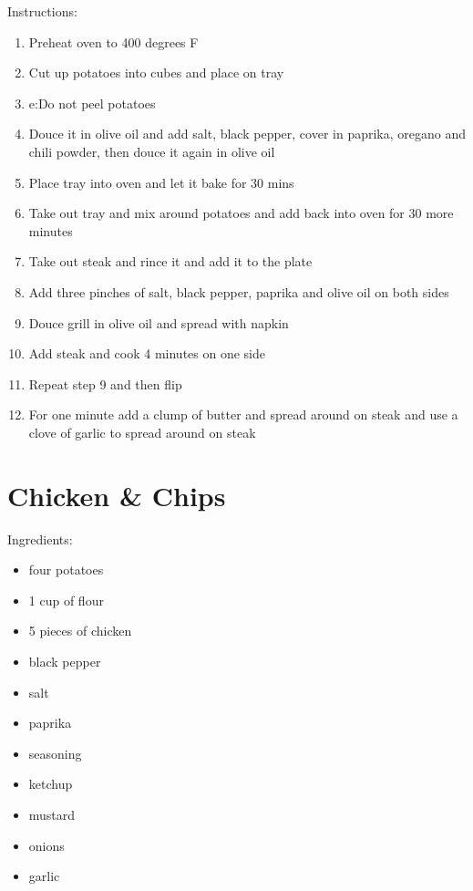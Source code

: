 \documentclass{article}
\begin{document}
Instructions:
\begin{enumerate}
    \item Preheat oven to 400 degrees F
    \item Cut up potatoes into cubes and place on tray
    \item e:Do not peel potatoes 
    \item Douce it in olive oil and add salt, black pepper, cover in paprika, oregano and chili powder, then douce it again in olive oil
    \item Place tray into oven and let it bake for 30 mins
    \item Take out tray and mix around potatoes and add back into oven for 30 more minutes
    \item Take out steak and rince it and add it to the plate
    \item Add three pinches of salt, black pepper, paprika and olive oil on both sides
    \item Douce grill in olive oil and spread with napkin
    \item Add steak and cook 4 minutes on one side 
    \item Repeat step 9 and then flip 
    \item For one minute add a clump of butter and spread around on steak and use a clove of garlic to spread around on steak

\end{enumerate}


\section{Chicken \& Chips}

Ingredients:

\begin{itemize}
    \item four potatoes
    \item 1 cup of flour
    \item 5 pieces of chicken
    \item black pepper
    \item salt
    \item paprika
    \item seasoning
    \item ketchup
    \item mustard
    \item onions
    \item garlic

\end{itemize}
\end{document}
